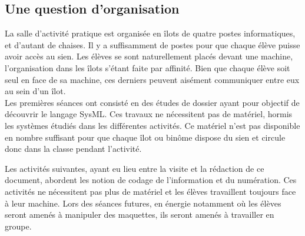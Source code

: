 \documentclass[pdftex,a4paper,12pt]{article}
\begin{document}
	\subsection{Une question d'organisation}
	La salle d'activité pratique est organisée en îlots de quatre postes informatiques, et d'autant de chaises.
	Il y a suffisamment de postes pour que chaque élève puisse avoir accès au sien.
	Les élèves se sont naturellement placés devant une machine, l'organisation dans les îlots s'étant faite par affinité.
	Bien que chaque élève soit seul en face de sa machine, ces derniers peuvent aisément communiquer entre eux au sein d'un îlot.\\

	Les premières séances ont consisté en des études de dossier ayant pour objectif de découvrir le langage SysML.
	Ces travaux ne nécessitent pas de matériel, hormis les systèmes étudiés dans les différentes activités.
	Ce matériel n'est pas disponible en nombre suffisant pour que chaque îlot ou binôme dispose du sien et circule donc dans la classe pendant l'activité.

	Les activités suivantes, ayant eu lieu entre la visite et la rédaction de ce document, abordent les notion de codage de l'information et du numération.
	Ces activités ne nécessitent pas plus de matériel et les élèves travaillent toujours face à leur machine.
	Lors des séances futures, en énergie notamment où les élèves seront amenés à manipuler des maquettes, ils seront amenés à travailler en groupe.\\
\end{document}
